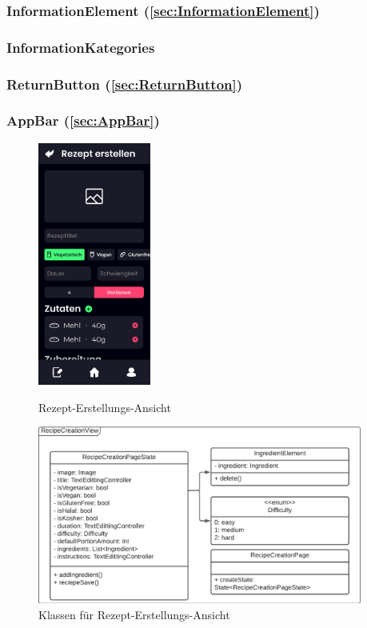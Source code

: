 \documentclass{entwurfsheft}
\begin{document}
\subsubsection*{InformationElement (\ref{sec:InformationElement})}

\subsubsection*{InformationKategories}

\subsubsection*{ReturnButton (\ref{sec:ReturnButton})}

\subsubsection*{AppBar (\ref{sec:AppBar})}
\begin{figure}[htp]
    \begin{minipage}
        [t]{0.49\textwidth}
        \centering
        \includegraphics[height=80mm]{images/Presentation-layer/RecipeCreationView.jpg}
        \caption{Rezept-Erstellungs-Ansicht}
    \end{minipage}
    \begin{minipage}
        [t]{0.49\textwidth}
        \centering
        \includegraphics[width=0.95\textwidth]{images/Presentation-layer/RecipeCreationViewClass.pdf}
        \caption{Klassen für Rezept-Erstellungs-Ansicht}
    \end{minipage}
\end{figure}
\end{document}
